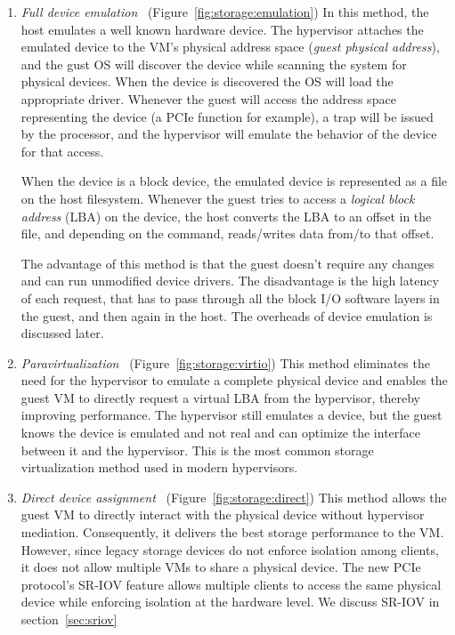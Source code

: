 \begin{enumerate}
\item
  \emph{Full device emulation}~\cite{sugerman2001virtualizing} (Figure~\ref{fig:storage:emulation})\quad
  In this method, the host emulates a well known hardware device.
  The hypervisor attaches the emulated device to the VM's physical address space (\emph{guest physical address}), and the gust OS will discover the device while scanning the system for physical devices. When the device is discovered
  the OS will load the appropriate driver. Whenever the guest will access the address space representing the device (a PCIe function for example), a trap will be issued by the processor, and the hypervisor will emulate the
  behavior of the device for that access.

  When the device is a block device, the emulated device is represented as a file on the host filesystem. Whenever the guest tries to access a \emph{logical block address} (LBA) on the device, the host converts the LBA to an offset
  in the file, and depending on the command, reads/writes data from/to that offset.

  The advantage of this method is that the guest doesn't require any changes and can run unmodified device drivers.
  The disadvantage is the high latency of each request, that has to pass through all the block I/O software layers in the guest, and then again in the host. 
  The overheads of device emulation is discussed later.

  
\item
  \emph{Paravirtualization}~\cite{barham2003xen,russell2008virtio} (Figure~\ref{fig:storage:virtio})\quad
  This method eliminates the need for the hypervisor to emulate a complete physical device and enables the guest VM to directly request a virtual LBA from the
  hypervisor, thereby improving performance. The hypervisor still emulates a device, but the guest knows the device is emulated and not real and can optimize the interface between it and the hypervisor. 
  This is the most common storage virtualization method used in modern hypervisors.

\item
  \emph{Direct device assignment}~\cite{raj2007high} (Figure~\ref{fig:storage:direct})\quad
  This method allows the guest VM to directly interact with the physical device without hypervisor mediation. 
  Consequently, it delivers the best storage performance to the VM. However, since legacy storage devices do not enforce isolation among clients, it does not allow multiple VMs to share a physical device. The new PCIe protocol's SR-IOV feature
  allows multiple clients to access the same physical device while enforcing isolation at the hardware level. We discuss SR-IOV in section~\ref{sec:sriov}
  

\end{enumerate}


